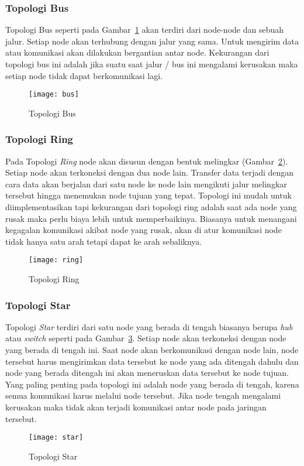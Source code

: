 \subsubsection{Topologi Bus}
Topologi Bus seperti pada Gambar~\ref{fig:bus} akan terdiri dari node-node dan sebuah jalur. Setiap node akan terhubung dengan jalur yang sama. Untuk mengirim data atau komunikasi akan dilakukan bergantian antar node. Kekurangan dari topologi bus ini adalah jika suatu saat jalur / bus ini mengalami kerusakan maka setiap node tidak dapat berkomunikasi lagi.
\begin{figure} [H]
	\centering  
	\texttt{[image: bus]}  
	\caption[Topologi Bus]{Topologi Bus} 
	\label{fig:bus} 
\end{figure} 

\subsubsection{Topologi Ring}
Pada Topologi \textit{Ring} node akan disusun dengan bentuk melingkar (Gambar~\ref{fig:ring}). Setiap node akan terkoneksi dengan dua node lain. Transfer data terjadi dengan cara data akan berjalan dari satu node ke node lain mengikuti jalur melingkar tersebut hingga menemukan node tujuan yang tepat. Topologi ini mudah untuk diimplementasikan tapi kekurangan dari topologi ring adalah saat ada node yang rusak maka perlu biaya lebih untuk memperbaikinya. Biasanya  untuk menangani kegagalan komunikasi akibat node yang rusak, akan di atur komunikasi node tidak hanya satu arah tetapi dapat ke arah sebaliknya.
\begin{figure} [H]
	\centering  
	\texttt{[image: ring]}  
	\caption[Topologi Ring]{Topologi Ring} 
	\label{fig:ring} 
\end{figure} 

\subsubsection{Topologi Star}
Topologi \textit{Star} terdiri dari satu node yang berada di tengah biasanya berupa \textit{hub} atau \textit{switch} seperti pada Gambar~\ref{fig:star}. Setiap node akan terkoneksi dengan node yang berada di tengah ini. Saat node akan berkomunikasi dengan node lain, node tersebut harus mengirimkan data tersebut ke node yang ada ditengah dahulu dan node yang berada ditengah ini akan meneruskan data tersebut ke node tujuan. Yang paling penting pada topologi ini adalah node yang berada di tengah, karena semua komunikasi harus melalui node tersebut. Jika node tengah mengalami kerusakan maka tidak akan terjadi komunikasi antar node pada jaringan tersebut.
\begin{figure} [H]
	\centering  
	\texttt{[image: star]}  
	\caption[Topologi Star]{Topologi Star} 
	\label{fig:star} 
\end{figure} 

